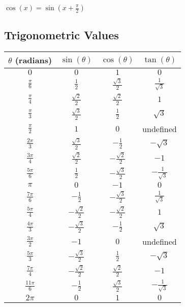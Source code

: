 \(\cos(x) = \sin(x + \frac{\pi}{2})\)

\subsection{Trigonometric Values}
\smallskip

\begin{center}
    \renewcommand{\arraystretch}{1.4}
    \begin{tabular}{|c|c|c|c|}
    \hline
    \(\theta\) (radians) & \(\sin(\theta)\) & \(\cos(\theta)\) & \(\tan(\theta)\) \\
    \hline
    \(0\) & \(0\) & \(1\) & \(0\) \\
    \hline
    \(\frac{\pi}{6}\) & \(\frac{1}{2}\) & \(\frac{\sqrt{3}}{2}\) & \(\frac{1}{\sqrt{3}}\) \\
    \hline
    \(\frac{\pi}{4}\) & \(\frac{\sqrt{2}}{2}\) & \(\frac{\sqrt{2}}{2}\) & \(1\) \\
    \hline
    \(\frac{\pi}{3}\) & \(\frac{\sqrt{3}}{2}\) & \(\frac{1}{2}\) & \(\sqrt{3}\) \\
    \hline
    \(\frac{\pi}{2}\) & \(1\) & \(0\) & undefined \\
    \hline
    \(\frac{2\pi}{3}\) & \(\frac{\sqrt{3}}{2}\) & \(-\frac{1}{2}\) & \(-\sqrt{3}\) \\
    \hline
    \(\frac{3\pi}{4}\) & \(\frac{\sqrt{2}}{2}\) & \(-\frac{\sqrt{2}}{2}\) & \(-1\) \\
    \hline
    \(\frac{5\pi}{6}\) & \(\frac{1}{2}\) & \(-\frac{\sqrt{3}}{2}\) & \(-\frac{1}{\sqrt{3}}\) \\
    \hline
    \(\pi\) & \(0\) & \(-1\) & \(0\) \\
    \hline
    \(\frac{7\pi}{6}\) & \(-\frac{1}{2}\) & \(-\frac{\sqrt{3}}{2}\) & \(\frac{1}{\sqrt{3}}\) \\
    \hline
    \(\frac{5\pi}{4}\) & \(-\frac{\sqrt{2}}{2}\) & \(-\frac{\sqrt{2}}{2}\) & \(1\) \\
    \hline
    \(\frac{4\pi}{3}\) & \(-\frac{\sqrt{3}}{2}\) & \(-\frac{1}{2}\) & \(\sqrt{3}\) \\
    \hline
    \(\frac{3\pi}{2}\) & \(-1\) & \(0\) & undefined \\
    \hline
    \(\frac{5\pi}{3}\) & \(-\frac{\sqrt{3}}{2}\) & \(\frac{1}{2}\) & \(-\sqrt{3}\) \\
    \hline
    \(\frac{7\pi}{4}\) & \(-\frac{\sqrt{2}}{2}\) & \(\frac{\sqrt{2}}{2}\) & \(-1\) \\
    \hline
    \(\frac{11\pi}{6}\) & \(-\frac{1}{2}\) & \(\frac{\sqrt{3}}{2}\) & \(-\frac{1}{\sqrt{3}}\) \\
    \hline
    \(2\pi\) & \(0\) & \(1\) & \(0\) \\
    \hline
    \end{tabular}
\end{center}

